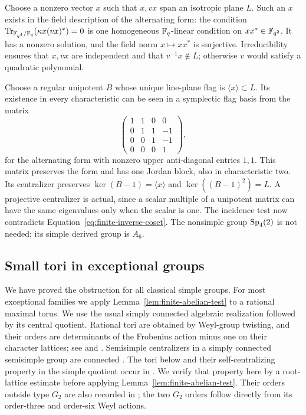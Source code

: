 Choose a nonzero vector $x$ such that $x,vx$ span an isotropic
plane $L$. Such an $x$ exists in the field description of the
alternating form: the condition
$\operatorname{Tr}_{\mathbb F_{q^4}/\mathbb F_q}(\kappa x(vx)^*)=0$ is one homogeneous
$\mathbb F_q$-linear condition on $xx^*\in\mathbb F_{q^2}$. It has a nonzero
solution, and the field norm $x\mapsto xx^*$ is surjective.
Irreducibility ensures that $x,vx$ are independent and that
$v^{-1}x\notin L$; otherwise $v$ would satisfy a quadratic polynomial.

Choose a regular unipotent $B$ whose unique line-plane flag is
$\langle x\rangle\subset L$. Its existence in every characteristic
can be seen in a symplectic flag basis from the matrix
\[
 \begin{pmatrix}
 1&1&0&0\\0&1&1&-1\\0&0&1&-1\\0&0&0&1
 \end{pmatrix},
\]
for the alternating form with nonzero upper anti-diagonal entries
$1,1$. This matrix preserves the form and has one Jordan block,
also in characteristic two. Its centralizer preserves
$\ker(B-1)=\langle x\rangle$ and $\ker((B-1)^2)=L$.
A projective centralizer is actual, since a scalar multiple of
a unipotent matrix can have the same eigenvalues only when the
scalar is one. The incidence test now contradicts
Equation~\eqref{eq:finite-inverse-coset}. The nonsimple group
$\operatorname{Sp}_4(2)$ is not needed; its simple derived group is $A_6$.

\subsection{Small tori in exceptional groups}

We have proved the obstruction for all classical simple groups.
For most exceptional families we apply
Lemma~\ref{lem:finite-abelian-test} to a rational maximal torus.
We use the usual simply connected algebraic realization followed
by its central quotient. Rational tori are obtained by Weyl-group
twisting, and their orders are determinants of the Frobenius action
minus one on their character lattices; see \cite{Steinberg} and
\cite[Propositions~25.1--25.3]{MalleTesterman}. Semisimple centralizers
in a simply connected semisimple group are connected
\cite[Section~2.10]{SteinbergRegular1965}. The tori below and their
self-centralizing property in the simple quotient occur in
\cite[Corollary~8.2 and Lemma~8.7]{SegevSeitz2002}.
We verify that property here by a root-lattice estimate before applying
Lemma~\ref{lem:finite-abelian-test}. Their orders outside type $G_2$
are also recorded in \cite[Section~3]{GarionLarsenLubotzky}; the two
$G_2$ orders follow directly from its order-three and order-six Weyl
actions.

